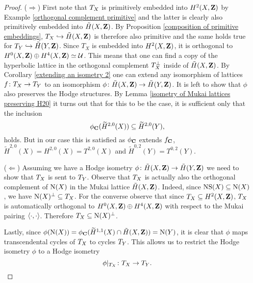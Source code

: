 \begin{proof}
    ($\Rightarrow$) First note that $T_{X}$ is primitively embedded into $H^{2}(X, \mathbf Z)$ by Example \ref{orthogonal complement primitive} and the latter is clearly also primitively embedded into $\,\tilde{\!{H}}(X, \mathbf Z)$. By Proposition \ref{composition of primitive embeddings}, $T_X \hookrightarrow \,\tilde{\!{H}}(X, \mathbf Z)$ is therefore also primitive and the same holds true for $T_Y \hookrightarrow \,\tilde{\!{H}}(Y, \mathbf Z)$. Since $T_X$ is embedded into $H^{2}(X, \mathbf Z)$, it is orthogonal to $H^0(X, \mathbf Z) \oplus H^4(X, \mathbf Z) \simeq \mathcal U$. This means that one can find a copy of the hyperbolic lattice in the orthogonal complement $T_{X}^\perp$ inside of $\,\tilde{\!{H}}(X, \mathbf Z)$. By Corollary \ref{extending an isometry 2} one can extend any isomorphism of lattices $f \colon T_{X} \to T_{Y}$ to an isomorphism $\phi \colon \,\tilde{\!{H}}(X, \mathbf Z) \to \,\tilde{\!{H}}(Y, \mathbf Z)$. It is left to show that $\phi$ also preserves the Hodge structures. By Lemma \ref{isometry of Mukai lattices preserving H20} it turns out that for this to be the case, it is sufficient only that the inclusion
    \[
        \phi_\mathbf C(\widetilde{H}^{2,0}(X)) \subseteq \widetilde{H}^{2,0}(Y),
    \]
    holds. But in our case this is satisfied as $\phi_\mathbf C$ extends $f_\mathbf C$, $\widetilde{H}^{2,0}(X) = H^{2,0}(X) = T^{2,0}(X)$ and $\widetilde{H}^{0,2}(Y) = T^{0,2}(Y)$.

    ($\Leftarrow$) Assuming we have a Hodge isometry $\phi \colon \,\tilde{\!{H}}(X, \mathbf Z) \to \,\tilde{\!{H}}(Y, \mathbf Z)$ we need to show that $T_{X}$ is sent to $T_{Y}$. 
    Observe that $T_{X}$ is actually also the orthogonal complement of $\operatorname{N}(X)$ in the Mukai lattice $\,\tilde{\!{H}}(X, \mathbf Z)$. Indeed, since $\operatorname{NS}(X) \subseteq \operatorname{N}(X)$, we have $\operatorname{N}(X)^\perp \subseteq T_{X}$. For the converse observe that since $T_{X}\subseteq H^{2}(X, \mathbf Z)$, $T_{X}$ is automatically orthogonal to $H^{0}(X, \mathbf Z) \oplus H^{4}(X, \mathbf Z)$ with respect to the Mukai pairing $\langle \cdot, \cdot \rangle$. Therefore $T_{X} \subseteq \operatorname{N}(X)^\perp$.

    Lastly, since $\phi(\operatorname{N}(X)) = \phi_\mathbf C(\widetilde{H}^{1,1}(X) \cap \,\tilde{\!{H}}(X, \mathbf Z)) = \operatorname{N}(Y)$, it is clear that $\phi$ maps transcendental cycles of $T_{X}$ to cycles $T_{Y}$. This allows us to restrict the Hodge isometry $\phi$ to a Hodge isometry
    \[
        \phi|_{T_{X}} \colon T_{X} \to T_{Y}. \qedhere
    \]
\end{proof}

